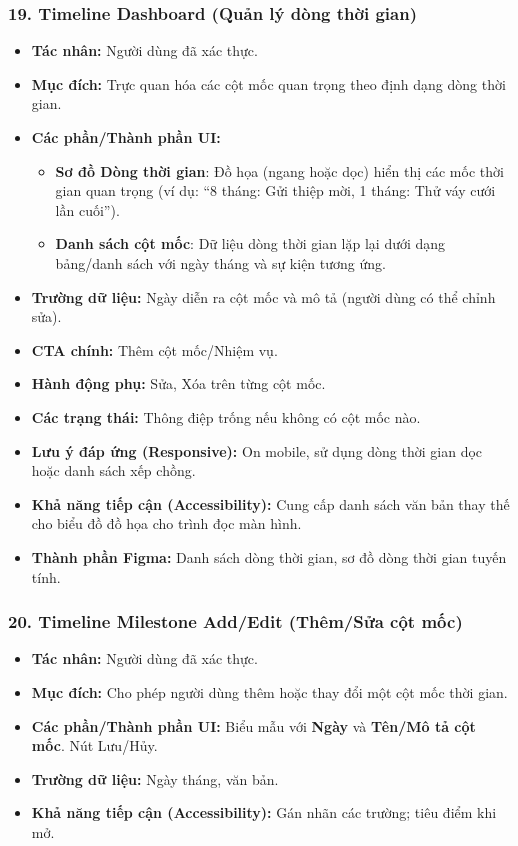 \documentclass[11pt,a4paper]{article}
\begin{document}
\subsubsection{19. Timeline Dashboard (Quản lý dòng thời gian)}
\begin{itemize}
    \item \textbf{Tác nhân:} Người dùng đã xác thực.
    \item \textbf{Mục đích:} Trực quan hóa các cột mốc quan trọng theo định dạng dòng thời gian.
    \item \textbf{Các phần/Thành phần UI:}
    \begin{itemize}
        \item \textbf{Sơ đồ Dòng thời gian}: Đồ họa (ngang hoặc dọc) hiển thị các mốc thời gian quan trọng (ví dụ: ``8 tháng: Gửi thiệp mời, 1 tháng: Thử váy cưới lần cuối'').
        \item \textbf{Danh sách cột mốc}: Dữ liệu dòng thời gian lặp lại dưới dạng bảng/danh sách với ngày tháng và sự kiện tương ứng.
    \end{itemize}
    \item \textbf{Trường dữ liệu:} Ngày diễn ra cột mốc và mô tả (người dùng có thể chỉnh sửa).
    \item \textbf{CTA chính:} Thêm cột mốc/Nhiệm vụ.
    \item \textbf{Hành động phụ:} Sửa, Xóa trên từng cột mốc.
    \item \textbf{Các trạng thái:} Thông điệp trống nếu không có cột mốc nào.
    \item \textbf{Lưu ý đáp ứng (Responsive):} On mobile, sử dụng dòng thời gian dọc hoặc danh sách xếp chồng.
    \item \textbf{Khả năng tiếp cận (Accessibility):} Cung cấp danh sách văn bản thay thế cho biểu đồ đồ họa cho trình đọc màn hình.
    \item \textbf{Thành phần Figma:} Danh sách dòng thời gian, sơ đồ dòng thời gian tuyến tính.
\end{itemize}

\subsubsection{20. Timeline Milestone Add/Edit (Thêm/Sửa cột mốc)}
\begin{itemize}
    \item \textbf{Tác nhân:} Người dùng đã xác thực.
    \item \textbf{Mục đích:} Cho phép người dùng thêm hoặc thay đổi một cột mốc thời gian.
    \item \textbf{Các phần/Thành phần UI:} Biểu mẫu với \textbf{Ngày} và \textbf{Tên/Mô tả cột mốc}. Nút Lưu/Hủy.
    \item \textbf{Trường dữ liệu:} Ngày tháng, văn bản.
    \item \textbf{Khả năng tiếp cận (Accessibility):} Gán nhãn các trường; tiêu điểm khi mở.
\end{itemize}
\end{document}
